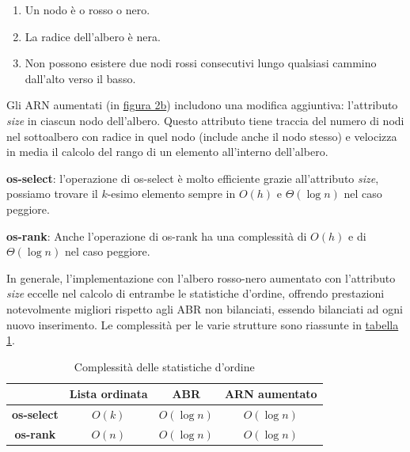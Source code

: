 \documentclass[onecolumn]{article}
\begin{document}
\begin{enumerate}
	\setlength\itemsep{-0.25em}
	\item Un nodo è o rosso o nero.
	\item La radice dell'albero è nera.
	\item Non possono esistere due nodi rossi consecutivi lungo qualsiasi cammino dall'alto verso il basso.
\end{enumerate}

Gli ARN aumentati (in \hyperref[fig:alberi]{figura 2b}) includono una modifica aggiuntiva: l'attributo \textit{size} in ciascun nodo dell'albero. Questo attributo tiene traccia del numero di nodi nel sottoalbero con radice in quel nodo (include anche il nodo stesso) e velocizza in media il calcolo del rango di un elemento all'interno dell'albero. \vspace{1em}

\textbf{os-select}: l'operazione di os-select è molto efficiente grazie all'attributo \textit{size}, possiamo trovare il $k$-esimo elemento sempre in $O(h)$ e $\Theta(\log n)$ nel caso peggiore. \vspace{0.5em}

\textbf{os-rank}: Anche l'operazione di os-rank ha una complessità di $O(h)$ e di $\Theta(\log n)$ nel caso peggiore. \vspace{1em}

In generale, l'implementazione con l'albero rosso-nero aumentato con l'attributo \textit{size} eccelle nel calcolo di entrambe le statistiche d'ordine, offrendo prestazioni notevolmente migliori rispetto agli ABR non bilanciati, essendo bilanciati ad ogni nuovo inserimento. Le complessità per le varie strutture sono riassunte in \hyperref[tab:complessita]{tabella 1}.

\begin{table}[t]
	\centering
	\begin{tabular}{|c|c|c|c|}
		\hline
		                   & Lista ordinata & \hspace*{2em}ABR\hspace*{2em} & ARN aumentato \\
		\hline
		\textbf{os-select} & $O(k)$         & $O(\log n)$                   & $O(\log n)$   \\
		\hline
		\textbf{os-rank}   & $O(n)$         & $O(\log n)$                   & $O(\log n)$   \\
		\hline
	\end{tabular}
	\caption{Complessità delle statistiche d'ordine}
	\label{tab:complessita}
\end{table}
\end{document}
